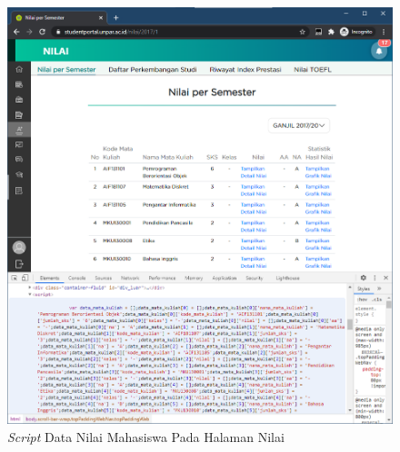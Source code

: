 \begin{enumerate}
\begin{itemize}
    	\begin{figure}[H]
        	\centering
        	\includegraphics[scale=0.5]{Gambar/nilai_script.png}
        	\caption{\textit{Script} Data Nilai Mahasiswa Pada Halaman Nilai}
        	\label{fig:4_nilai_script}
        \end{figure}
	\end{itemize}
\end{enumerate}

